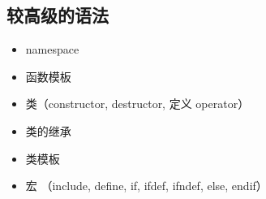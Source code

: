\subsection{较高级的语法}
\begin{itemize}
\item namespace
\item 函数模板
\item 类（constructor, destructor, 定义 operator）
\item 类的继承
\item 类模板
\item 宏 （include, define, if, ifdef, ifndef, else, endif）
\end{itemize}
